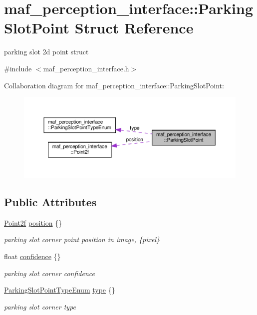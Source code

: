 \hypertarget{structmaf__perception__interface_1_1ParkingSlotPoint}{}\section{maf\+\_\+perception\+\_\+interface\+:\+:Parking\+Slot\+Point Struct Reference}
\label{structmaf__perception__interface_1_1ParkingSlotPoint}


parking slot 2d point struct  




{\ttfamily \#include $<$maf\+\_\+perception\+\_\+interface.\+h$>$}



Collaboration diagram for maf\+\_\+perception\+\_\+interface\+:\+:Parking\+Slot\+Point\+:\nopagebreak
\begin{figure}[H]
\begin{center}
\leavevmode
\includegraphics[width=350pt]{structmaf__perception__interface_1_1ParkingSlotPoint__coll__graph}
\end{center}
\end{figure}
\subsection*{Public Attributes}
\begin{DoxyCompactItemize}
\item 
\hyperlink{structmaf__perception__interface_1_1Point2f}{Point2f} \hyperlink{structmaf__perception__interface_1_1ParkingSlotPoint_aa4781e2860075aebd20849e0c80f54a8}{position} \{\}
\begin{DoxyCompactList}\small\item\em parking slot corner point position in image, \{pixel\} \end{DoxyCompactList}\item 
float \hyperlink{structmaf__perception__interface_1_1ParkingSlotPoint_a5145281c6027cb36bda2ebe07cef8a04}{confidence} \{\}
\begin{DoxyCompactList}\small\item\em parking slot corner confidence \end{DoxyCompactList}\item 
\hyperlink{structmaf__perception__interface_1_1ParkingSlotPointTypeEnum}{Parking\+Slot\+Point\+Type\+Enum} \hyperlink{structmaf__perception__interface_1_1ParkingSlotPoint_ac7b0dc31c948174bcd9d344c74abb085}{type} \{\}
\begin{DoxyCompactList}\small\item\em parking slot corner type \end{DoxyCompactList}\end{DoxyCompactItemize}


